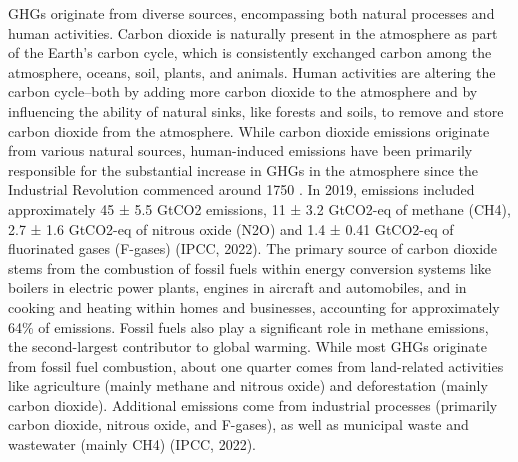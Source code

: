 GHGs originate from diverse sources, encompassing both natural processes and human activities. Carbon dioxide is naturally present in the atmosphere as part of the Earth's carbon cycle, which is consistently exchanged carbon among the atmosphere, oceans, soil, plants, and animals. Human activities are altering the carbon cycle–both by adding more carbon dioxide to the atmosphere and by influencing the ability of natural sinks, like forests and soils, to remove and store carbon dioxide from the atmosphere. While carbon dioxide emissions originate from various natural sources, human-induced emissions have been primarily responsible for the substantial increase in GHGs in the atmosphere since the Industrial Revolution commenced around 1750 \citep{RN3}. In 2019, emissions included approximately 45 ± 5.5 GtCO2 emissions, 11 ± 3.2 GtCO2-eq of methane (CH4), 2.7 ± 1.6 GtCO2-eq of nitrous oxide (N2O) and 1.4 ± 0.41 GtCO2-eq of fluorinated gases (F-gases) (IPCC, 2022). The primary source of carbon dioxide stems from the combustion of fossil fuels within energy conversion systems like boilers in electric power plants, engines in aircraft and automobiles, and in cooking and heating within homes and businesses, accounting for approximately 64\% of emissions. Fossil fuels also play a significant role in methane emissions, the second-largest contributor to global warming. While most GHGs originate from fossil fuel combustion, about one quarter comes from land-related activities like agriculture (mainly methane and nitrous oxide) and deforestation (mainly carbon dioxide). Additional emissions come from industrial processes (primarily carbon dioxide, nitrous oxide, and F-gases), as well as municipal waste and wastewater (mainly CH4) (IPCC, 2022). 
